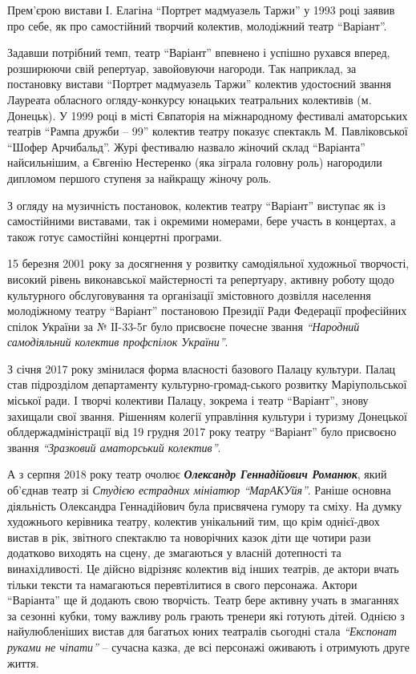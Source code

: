 
Прем'єрою вистави І. Елагіна \enquote{Портрет мадмуазель Таржи} у 1993 році заявив про
себе, як про самостійний творчий колектив, молодіжний театр \enquote{Варіант}.

Задавши потрібний темп, театр \enquote{Варіант} впевнено і успішно рухався вперед,
розширюючи свій репертуар, завойовуючи нагороди. Так наприклад, за постановку
вистави \enquote{Портрет мадмуазель Таржи} колектив удостоєний звання Лауреата
обласного огляду-конкурсу юнацьких театральних колективів (м. Донецьк). У 1999
році в місті Євпаторія на міжнародному фестивалі аматорських театрів \enquote{Рампа
дружби – 99} колектив театру показує спектакль М. Павліковської \enquote{Шофер
Арчибальд}. Журі фестивалю назвало жіночий склад \enquote{Варіанта} найсильнішим, а
Євгенію Нестеренко (яка зіграла головну роль) нагородили дипломом першого
ступеня за найкращу жіночу роль.

З огляду на музичність постановок, колектив театру \enquote{Варіант} виступає як із
самостійними виставами, так і окремими номерами, бере участь в концертах, а
також готує самостійні концертні програми.


15 березня 2001 року за досягнення у розвитку самодіяльної художньої творчості,
високий рівень виконавської майстерності та репертуару, активну роботу щодо
культурного обслуговування та організації змістовного дозвілля населення
молодіжному театру \enquote{Варіант} постановою Президії Ради Федерації професійних
спілок України за № ІІ-33-5г було присвоєне почесне звання \emph{\enquote{Народний
самодіяльний колектив профспілок України}}.

З січня 2017 року змінилася форма власності базового Палацу культури. Палац
став підрозділом департаменту культурно-громад\hyp{}ського розвитку Маріупольської
міської ради. І творчі колективи Палацу, зокрема і театр \enquote{Варіант}, знову
захищали свої звання. Рішенням колегії управління культури і туризму Донецької
облдержадміністрації від 19 грудня 2017 року театру \enquote{Варіант} було присвоєно
звання \emph{\enquote{Зразковий аматорський колектив}}.

А з серпня 2018 року театр очолює \emph{\textbf{Олександр Геннадійович Романюк}}, який об'єднав
театр зі \emph{Студією естрадних мініатюр \enquote{МарАКУйя}}. Раніше основна діяльність
Олександра Геннадійович була присвячена гумору та сміху. На думку художнього
керівника театру, колектив унікальний тим, що крім однієї-двох вистав в рік,
звітного спектаклю та новорічних казок діти ще чотири рази додатково виходять
на сцену, де змагаються у власній дотепності та винахідливості. Це дійсно
відрізняє колектив від інших театрів, де актори вчать тільки тексти та
намагаються перевтілитися в свого персонажа. Актори \enquote{Варіанта} ще й додають
свою творчість. Театр бере активну учать в змаганнях за сезонні кубки, тому
важливу роль грають тренери які готують дітей. Однією з найулюбленіших вистав
для багатьох юних театралів сьогодні стала \emph{\enquote{Експонат руками не чіпати}} –
сучасна казка, де всі персонажі оживають і отримують друге життя.


